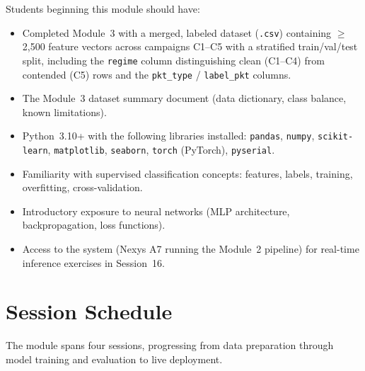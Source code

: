 \documentclass[11pt,letterpaper]{article}
\begin{document}
	Students beginning this module should have:
	\begin{itemize}[leftmargin=2em]
		\item Completed Module~3 with a merged, labeled \RF{} dataset (\texttt{.csv}) containing $\geq$2{,}500 feature vectors across campaigns C1--C5 with a stratified train/val/test split, including the \texttt{regime} column distinguishing clean (C1--C4) from contended (C5) rows and the \texttt{pkt\_type} / \texttt{label\_pkt} columns.
		\item The Module~3 dataset summary document (data dictionary, class balance, known limitations).
		\item Python~3.10+ with the following libraries installed: \texttt{pandas}, \texttt{numpy}, \texttt{scikit-learn}, \texttt{matplotlib}, \texttt{seaborn}, \texttt{torch} (PyTorch), \texttt{pyserial}.
		\item Familiarity with supervised classification concepts: features, labels, training, overfitting, cross-validation.
		\item Introductory exposure to neural networks (MLP architecture, backpropagation, loss functions).
		\item Access to the \FPGA{} system (Nexys A7 running the Module~2 pipeline) for real-time inference exercises in Session~16.
	\end{itemize}

	\newpage
	\section{Session Schedule}

	The module spans four sessions, progressing from data preparation through model training and evaluation to live deployment.
\end{document}
